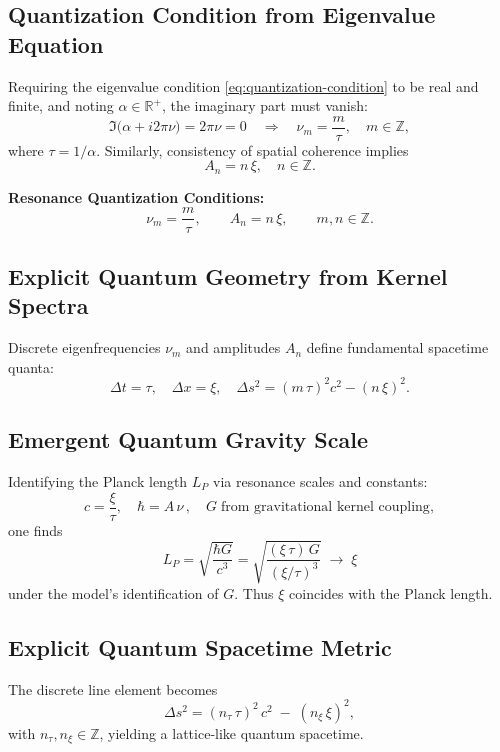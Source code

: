 \subsection{Quantization Condition from Eigenvalue Equation}
\label{sec:quantum-quantization}

Requiring the eigenvalue condition \eqref{eq:quantization-condition} to be real and finite, and noting \(\alpha\in\mathbb{R}^+\), the imaginary part must vanish:
\[
\Im\bigl(\alpha + i2\pi\nu\bigr) = 2\pi\nu = 0
\quad\Longrightarrow\quad
\nu_m = \frac{m}{\tau},
\quad m\in\mathbb{Z},
\]
where \(\tau = 1/\alpha\).  Similarly, consistency of spatial coherence implies
\[
A_n = n\,\xi,
\quad n\in\mathbb{Z}.
\]

\begin{framed}
\textbf{Resonance Quantization Conditions:}
\[
\nu_m = \frac{m}{\tau}, 
\qquad
A_n = n\,\xi,
\qquad m,n\in\mathbb{Z}.
\]
\end{framed}

\subsection{Explicit Quantum Geometry from Kernel Spectra}
\label{sec:quantum-geometry}

Discrete eigenfrequencies \(\nu_m\) and amplitudes \(A_n\) define fundamental spacetime quanta:
\[
\Delta t = \tau,
\quad
\Delta x = \xi,
\quad
\Delta s^2 = (m\,\tau)^2c^2 - (n\,\xi)^2.
\]

\subsection{Emergent Quantum Gravity Scale}
\label{sec:quantum-gravity}

Identifying the Planck length \(L_P\) via resonance scales and constants:
\[
c = \frac{\xi}{\tau}, 
\quad
\hbar = A\,\nu\,,
\quad
G \;\text{from gravitational kernel coupling},
\]
one finds
\[
L_P = \sqrt{\frac{\hbar G}{c^3}}
      = \sqrt{\frac{(\xi\,\tau)\,G}{(\xi/\tau)^3}}
      \;\longrightarrow\; \xi
\]
under the model’s identification of \(G\).  Thus \(\xi\) coincides with the Planck length.

\subsection{Explicit Quantum Spacetime Metric}
\label{sec:quantum-metric}

The discrete line element becomes
\begin{equation}
\Delta s^2 = (n_\tau\,\tau)^2\,c^2 \;-\; (n_\xi\,\xi)^2,
\label{eq:discrete-interval}
\end{equation}
with \(n_\tau,n_\xi \in \mathbb{Z}\), yielding a lattice‐like quantum spacetime.

